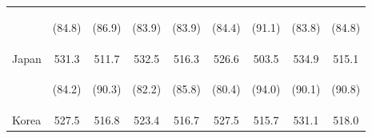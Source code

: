 \begin{center}
\begin{tabular}{lcccccccc}
 & \begin{footnotesize}(84.8)\end{footnotesize} & \begin{footnotesize}(86.9)\end{footnotesize} & \begin{footnotesize}(83.9)\end{footnotesize} & \begin{footnotesize}(83.9)\end{footnotesize} & \begin{footnotesize}(84.4)\end{footnotesize} & \begin{footnotesize}(91.1)\end{footnotesize} & \begin{footnotesize}(83.8)\end{footnotesize} & \begin{footnotesize}(84.8)\end{footnotesize}\\
\noalign{\smallskip}Japan & 531.3 & 511.7 & 532.5 & 516.3 & 526.6 & 503.5 & 534.9 & 515.1\\
 & \begin{footnotesize}(84.2)\end{footnotesize} & \begin{footnotesize}(90.3)\end{footnotesize} & \begin{footnotesize}(82.2)\end{footnotesize} & \begin{footnotesize}(85.8)\end{footnotesize} & \begin{footnotesize}(80.4)\end{footnotesize} & \begin{footnotesize}(94.0)\end{footnotesize} & \begin{footnotesize}(90.1)\end{footnotesize} & \begin{footnotesize}(90.8)\end{footnotesize}\\
\noalign{\smallskip}Korea & 527.5 & 516.8 & 523.4 & 516.7 & 527.5 & 515.7 & 531.1 & 518.0\\

\end{tabular}
\end{center}

